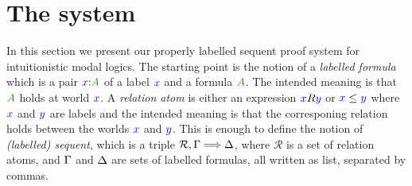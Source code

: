 \documentclass[a4paper]{article}
\theoremstyle{plain}
\newtheorem{theorem}{Theorem}[section]
\theoremstyle{definition}
\newcommand{\lutz}[1]{{\color{notgreen}[Lutz: #1]}}
\newcommand{\todo}[1]{{\color{red}[TODO: #1]}}
\newcommand{\B}{\mathcal{R}}
\newcommand{\lseq}[3]{#1 , #2 \SEQ #3}
\newcommand*{\IK}{\mathsf{IK}}
\newcommand*{\fm}[1]{{\color{notgreen}{#1}}}
\newcommand*{\lb}[1]{{\color{blue}{#1}}}
\newcommand*{\labels}[2]{\lb{#1}\mathord{:}\fm{#2}}
\newcommand*{\accs}[2]{\lb{#1}R\lb{#2}}
\newcommand*{\futs}[2]{\lb{#1}\le{\color{blue}{#2}}}
\newcommand{\SEQ}{\Longrightarrow}
\begin{document}
%
%
%
%

\section{The system}\label{sec:system}

In this section we present our properly labelled sequent proof system
for intuitionistic modal logics. The starting point is the notion of a
\emph{labelled formula} which is a pair $\labels xA$ of a label $\lb
x$ and a formula $\fm A$. The intended meaning is that $\fm A$ holds
at world $\lb x$. A \emph{relation atom} is either an expression
$\accs xy$ or $\futs xy$ where $\lb x$ and $\lb y$ are labels and the
intended meaning is that the corresponing relation holds between the
worlds $\lb x$ and $\lb y$. This is enough to define the notion of
\emph{(labelled) sequent}, which is a triple $\lseq\B\Left\Right$,
where $\B$ is a set of relation atoms, and $\Gamma$ and $\Delta$ are
sets of labelled formulas, all written as list, separated by commas.
\end{document}
